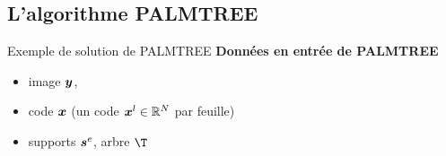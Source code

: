 \subsection{L'algorithme PALMTREE}
\begin{frame}{Exemple de solution de PALMTREE}
\textbf{Données en entrée de PALMTREE} \begin{itemize}
	\item image $\bm{y}$,
	\item code $\bm{x}$ (un code $\bm{x}^l \in \mathbb{R}^N$ par feuille)
	\item supports $\bm{s}^e$, arbre $\T$
\end{itemize}
\begin{figure}\centering
{}
\end{figure}
\end{frame}


